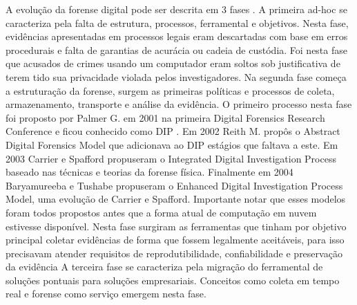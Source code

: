 \documentclass[conference]{IEEEtran}
\newcommand{\marcos}[1]{{\color{blue}{MARCOS: #1}}}
\begin{document}
\marcos{Hum... o que você de fato uso desses conceitos no seu trabalho? Pergunto porque está muito com cara de ``aula de história'', e você pode imaginar o quanto um revisor da área de exatas gostava de aula de história no colégio... Na boa, vai direto aos pontos que interessam, deixando esse blá-blá-blá para outro lugar (pode incluir na dissertação, que não tem limite de páginas, mas não em um artigo)}
A evolução da forense digital pode ser descrita em 3 fases \cite{Charters2008}. 
%
A primeira ad-hoc se caracteriza pela falta de estrutura, processos, ferramental e objetivos. 
%
Nesta fase, evidências apresentadas em processos legais eram descartadas com base em erros procedurais e falta de garantias de acurácia ou cadeia de custódia. 
%
Foi nesta fase que acusados de crimes usando um computador eram soltos sob justificativa de terem tido sua privacidade violada pelos investigadores. 
%
Na segunda fase começa a estruturação da forense, surgem as primeiras políticas e processos de coleta, armazenamento, transporte e análise da evidência. 
%
O primeiro processo nesta fase foi proposto por Palmer G. em 2001 na primeira Digital Forensics Research Conference e ficou conhecido como DIP \marcos{É uma sigla? Se for, dê o nome completo}. 
%
Em 2002 Reith M. propôs o Abstract Digital Forensics Model que adicionava ao DIP estágios que faltava a este. 
%
Em 2003 Carrier e Spafford propuseram o Integrated Digital Investigation Process baseado nas técnicas e teorias da forense física. 
%
Finalmente em 2004 Baryamureeba e Tushabe propuseram o Enhanced Digital Investigation Process Model, uma evolução de Carrier e Spafford. 
%
Importante notar que esses modelos foram todos propostos antes que a forma atual de computação em nuvem estivesse disponível. \cite{Grispos2012}
%
Nesta fase surgiram as ferramentas que tinham por objetivo principal coletar evidências de forma que fossem legalmente aceitáveis, para isso precisavam atender requisitos de reprodutibilidade, confiabilidade e preservação da evidência
%
A terceira fase se caracteriza pela migração do ferramental de soluções pontuais para soluções empresariais. 
%
Conceitos como coleta em tempo real e forense como serviço emergem nesta fase.
\end{document}
